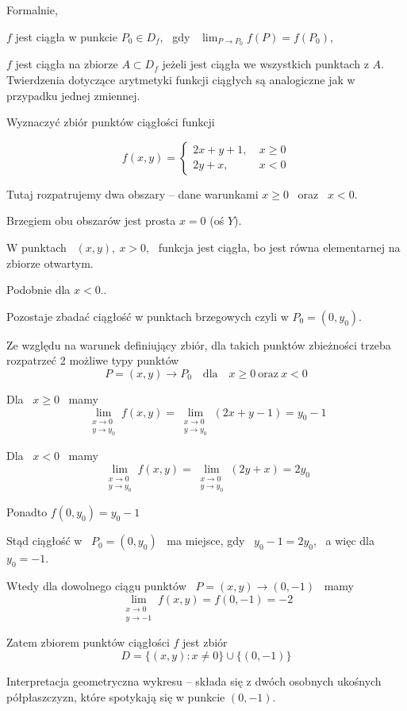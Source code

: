 Formalnie,

$f$ jest ciągła w punkcie $ P_0 \in D_f $, \ gdy \ $ \lim_{P \to P_0} f(P) = f(P_0) $,

$f$ jest ciągła na zbiorze $ A \subset D_f $ jeżeli jest ciągła we wszystkich punktach z $A$. \\

Twierdzenia dotyczące arytmetyki funkcji ciągłych są analogiczne jak w przypadku jednej zmiennej. \\

\begin{przyklad}

Wyznaczyć zbiór punktów ciągłości funkcji

$$ f(x,y) = \left\{ \begin{aligned} 2x + y + 1, & \ x \geq 0 \\ 2y + x, & \ x < 0 \end{aligned} \right. $$

Tutaj rozpatrujemy dwa obszary -- dane warunkami $ x \geq 0 $ \ oraz \ $x < 0$.

Brzegiem obu obszarów jest prosta $ x = 0 $ (oś $Y$).

W punktach \ $ (x,y), \ x > 0 $, \ funkcja jest ciągła, bo jest równa elementarnej na zbiorze otwartym.

Podobnie dla $ x < 0 $..

Pozostaje zbadać ciągłość w punktach brzegowych czyli w $ P_0  = (0, y_0) $.

Ze względu na warunek definiujący zbiór, dla takich punktów zbieżności trzeba rozpatrzeć 2 możliwe typy punktów
$$ P = (x,y) \to P_0 \quad \textrm{dla} \quad x \geq 0 \ \textrm{oraz} \ x < 0 $$

Dla \ $ x \geq 0 $ \ mamy
$$ \lim_{\substack{x \to 0 \\ y \to y_0}} f(x,y) = \lim_{\substack{x \to 0 \\ y \to y_0}} (2x + y - 1) = y_0 - 1 $$

Dla \ $ x < 0 $ \ mamy
$$ \lim_{\substack{x \to 0 \\ y \to y_0}} f(x,y) = \lim_{\substack{x \to 0 \\ y \to y_0}} (2y + x) = 2y_0 $$

Ponadto $ f(0,y_0) = y_0 - 1 $

Stąd ciągłość w \ $ P_0 = (0,y_0) $ \ ma miejsce, gdy \ $ y_0 - 1 = 2y_0 $, \ a więc dla \ $ y_0 = -1$.

Wtedy dla dowolnego ciągu punktów \ $ P = (x,y) \to (0, -1) $ \ mamy
$$ \lim_{\substack{x \to 0 \\ y \to -1}} f(x,y) = f(0,-1) = -2 $$

Zatem zbiorem punktów ciągłości $f$ jest zbiór
$$ D = \{ (x,y) : x \neq 0 \} \cup \{ (0,-1) \} $$

Interpretacja geometryczna wykresu -- składa się z dwóch osobnych ukośnych półpłaszczyzn, które spotykają
się w punkcie $(0, -1) $.
\end{przyklad}


